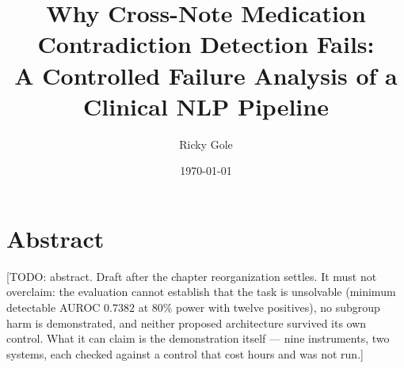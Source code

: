 \documentclass[11pt,oneside]{book}
\title{Why Cross-Note Medication Contradiction Detection Fails:\\A Controlled Failure Analysis of a Clinical NLP Pipeline}
\author{Ricky Gole}
\date{\today}
\begin{document}
\frontmatter
\maketitle

\chapter*{Abstract}

[TODO: abstract. Draft after the chapter reorganization settles. It must not
overclaim: the evaluation cannot establish that the task is unsolvable (minimum
detectable AUROC $0.7382$ at $80\%$ power with twelve positives), no subgroup
harm is demonstrated, and neither proposed architecture survived its own
control. What it can claim is the demonstration itself --- nine instruments,
two systems, each checked against a control that cost hours and was not run.]

\tableofcontents
\listoftables

\mainmatter












\backmatter


\end{document}
